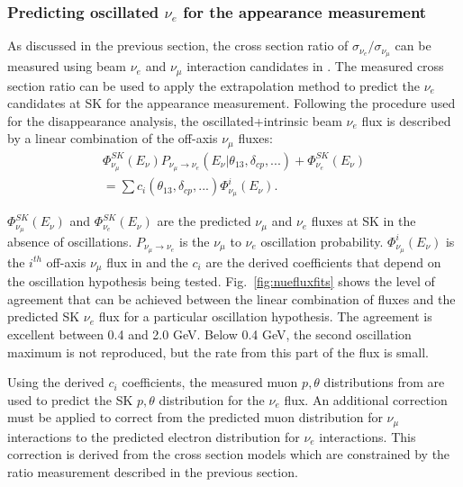 \subsubsection{Predicting oscillated $\nu_e$ for the appearance measurement} 

As discussed in the previous section, the cross section ratio of $\sigma_{\nu_{e}}/\sigma_{\nu_{\mu}}$ can be measured using beam $\nu_{e}$ and $\nu_{\mu}$ interaction candidates in \nuprism.  The measured cross section ratio can be used to apply the \nuprism extrapolation method to predict the $\nu_{e}$ candidates at SK for the appearance measurement.  Following the procedure used for the disappearance analysis, the oscillated+intrinsic beam $\nu_{e}$ flux is described by a linear combination of the \nuprism off-axis $\nu_{\mu}$ fluxes:
\begin{equation}
\begin{split}
\Phi^{SK}_{\nu_{\mu}}(E_{\nu})P_{\nu_{\mu}\rightarrow\nu_{e}}(E_{\nu}|\theta_{13},\delta_{cp},...)+\Phi^{SK}_{\nu_{e}}(E_{\nu})  \\
 = \sum c_i(\theta_{13},\delta_{cp},...) \Phi^i_{\nu_\mu}(E_\nu).
\end{split}
\end{equation}

$\Phi^{SK}_{\nu_{\mu}}(E_{\nu})$ and $\Phi^{SK}_{\nu_{e}}(E_{\nu})$ are the predicted $\nu_{\mu}$ and $\nu_{e}$ fluxes at SK in the absence of oscillations. $P_{\nu_{\mu}\rightarrow\nu_{e}}$ is the $\nu_{\mu}$ to $\nu_{e}$ oscillation probability.  $\Phi^i_{\nu_\mu}(E_\nu)$ is the $i^{th}$ off-axis $\nu_{\mu}$ flux in \nuprism and the $c_i$ are the derived coefficients that depend on the oscillation hypothesis being tested.  Fig.~\ref{fig:nuefluxfits} shows the level of agreement that can be achieved between the linear combination of \nuprism fluxes and the predicted SK $\nu_{e}$ flux for a particular oscillation hypothesis.  The agreement is excellent between 0.4 and 2.0 GeV.  Below 0.4 GeV, the second oscillation maximum is not reproduced, but the rate from this part of the flux is small.

Using the derived $c_i$ coefficients, the measured muon $p,\theta$ distributions from \nuprism are used to predict the SK $p,\theta$ distribution for the $\nu_e$ flux.  An additional correction must be applied to correct from the predicted muon distribution for $\nu_{\mu}$ interactions to the predicted electron distribution for $\nu_e$ interactions.  This correction is derived from the cross section models which are constrained by the ratio measurement described in the previous section.

